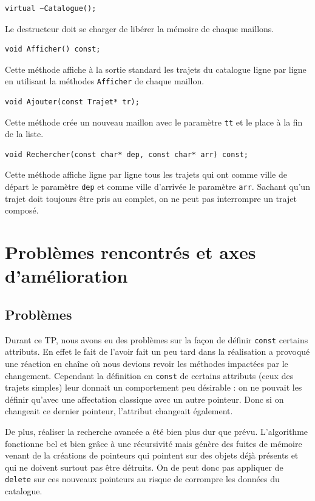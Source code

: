 \documentclass[11pt, a4paper]{article}
\begin{document}
\begin{lstlisting}
virtual ~Catalogue();
\end{lstlisting}
Le destructeur doit se charger de libérer la mémoire de chaque maillons.

\begin{lstlisting}
void Afficher() const;
\end{lstlisting}
Cette méthode affiche à la sortie standard les trajets du catalogue ligne par ligne en utilisant la
méthodes \texttt{Afficher} de chaque maillon.

\begin{lstlisting}
void Ajouter(const Trajet* tr);
\end{lstlisting}
Cette méthode crée un nouveau maillon avec le paramètre \texttt{tt} et le place à la fin de la liste.

\begin{lstlisting}
void Rechercher(const char* dep, const char* arr) const;
\end{lstlisting}
Cette méthode affiche ligne par ligne tous les trajets qui ont comme ville de départ le paramètre
\texttt{dep} et comme ville d'arrivée le paramètre \texttt{arr}.
Sachant qu'un trajet doit toujours être pris au complet, on ne peut pas interrompre un trajet
composé.

\section{Problèmes rencontrés et axes d'amélioration}
\subsection{Problèmes}
Durant ce TP, nous avons eu des problèmes sur la façon de définir \texttt{const} certains attributs.
En effet le fait de l'avoir fait un peu tard dans la réalisation a provoqué une réaction en chaîne
où nous devions revoir les méthodes impactées par le changement. Cependant la définition en
\texttt{const} de certains attributs (ceux des trajets simples) leur donnait un comportement peu
désirable : on ne pouvait les définir qu'avec une affectation classique avec un autre pointeur. Donc
si on changeait ce dernier pointeur, l'attribut changeait également.

De plus, réaliser la recherche avancée a été bien plus dur que prévu. L'algorithme fonctionne bel
et bien grâce à une récursivité mais génère des fuites de mémoire venant de la créations de
pointeurs qui pointent sur des objets déjà présents et qui ne doivent surtout pas être détruits. On
de peut donc pas appliquer de \texttt{delete} sur ces nouveaux pointeurs au risque de corrompre les
données du catalogue.
\end{document}
